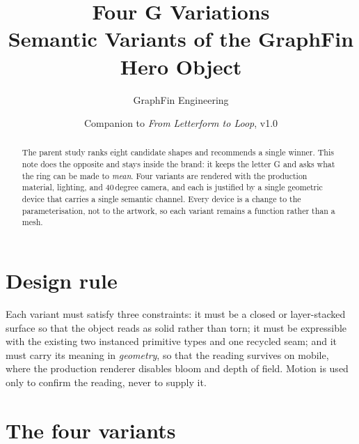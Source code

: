\documentclass[11pt,a4paper]{article}
\title{\textbf{Four G Variations}\\[2pt]
\large Semantic Variants of the GraphFin Hero Object}
\author{GraphFin Engineering}
\date{Companion to \emph{From Letterform to Loop}, v1.0}
\begin{document}
\color{ink}
\pagecolor{paperbg}

\begin{abstract}
\noindent
The parent study ranks eight candidate shapes and recommends a single winner.
This note does the opposite and stays inside the brand: it keeps the letter G
and asks what the ring can be made to \emph{mean}. Four variants are rendered
with the production material, lighting, and 40\,degree camera, and each is
justified by a single geometric device that carries a single semantic channel.
Every device is a change to the parameterisation, not to the artwork, so each
variant remains a function rather than a mesh.
\end{abstract}

\section{Design rule}

\noindent
Each variant must satisfy three constraints: it must be a closed or
layer-stacked surface so that the object reads as solid rather than torn; it
must be expressible with the existing two instanced primitive types and one
recycled seam; and it must carry its meaning in \emph{geometry}, so that the
reading survives on mobile, where the production renderer disables bloom and
depth of field. Motion is used only to confirm the reading, never to supply
it.

\section{The four variants}
\end{document}
